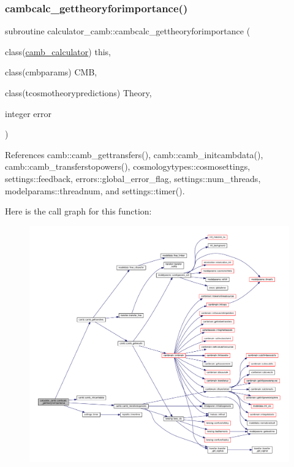 \subsubsection{\texorpdfstring{cambcalc\+\_\+gettheoryforimportance()}{cambcalc\_gettheoryforimportance()}}
{\footnotesize\ttfamily subroutine calculator\+\_\+camb\+::cambcalc\+\_\+gettheoryforimportance (\begin{DoxyParamCaption}\item[{class(\mbox{\hyperlink{structcalculator__camb_1_1camb__calculator}{camb\+\_\+calculator}})}]{this,  }\item[{class(cmbparams)}]{C\+MB,  }\item[{class(tcosmotheorypredictions)}]{Theory,  }\item[{integer}]{error }\end{DoxyParamCaption})\hspace{0.3cm}{\ttfamily [private]}}



References camb\+::camb\+\_\+gettransfers(), camb\+::camb\+\_\+initcambdata(), camb\+::camb\+\_\+transferstopowers(), cosmologytypes\+::cosmosettings, settings\+::feedback, errors\+::global\+\_\+error\+\_\+flag, settings\+::num\+\_\+threads, modelparams\+::threadnum, and settings\+::timer().

Here is the call graph for this function\+:
\nopagebreak
\begin{figure}[H]
\begin{center}
\leavevmode
\includegraphics[width=350pt]{namespacecalculator__camb_a46bd33ed008e289fb5cb08f6feb86419_cgraph}
\end{center}
\end{figure}
\mbox{\label{namespacecalculator__camb_a36d033f09a4d35c8b9a37d518fcebda0}} 
